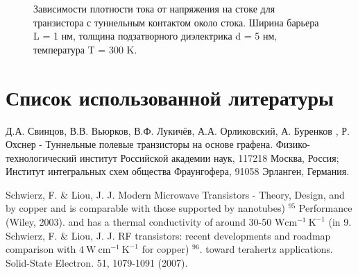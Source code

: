 \documentclass[a4paper,12pt]{article} %
\begin{document}
\begin{figure}[h!]
\caption{ Зависимости плотности тока от напряжения на стоке для транзистора с туннельным контактом около стока. Ширина барьера L = 1 нм, толщина подзатворного диэлектрика d = 5 нм, температура T = 300 K.}
\end{figure}



\newpage

\section{Список использованной литературы}

\noindent Д.А. Свинцов, В.В. Вьюрков, В.Ф. Лукичёв, А.А. Орликовский, А. Буренков , Р. Охснер - Туннельные полевые транзисторы на основе графена. Физико-технологический институт Российской академии наук, 117218 Москва, Россия; Институт интегральных схем общества Фраунгофера, 91058 Эрланген, Германия.

\medskip

\noindent Schwierz, F. \& Liou, J. J. Modern Microwave Transistors - Theory, Design, and by copper and is comparable with those supported by nanotubes) ${ }^{95}$ Performance (Wiley, 2003). and has a thermal conductivity of around 30-50 $\mathrm{W} \mathrm{cm}^{-1} \mathrm{~K}^{-1}$ (in 9. Schwierz, F. \& Liou, J. J. RF transistors: recent developments and roadmap comparison with $4 \mathrm{~W} \mathrm{~cm}^{-1} \mathrm{~K}^{-1}$ for copper) ${ }^{96}$. toward terahertz applications. Solid-State Electron. 51, 1079-1091 (2007).
\end{document}
